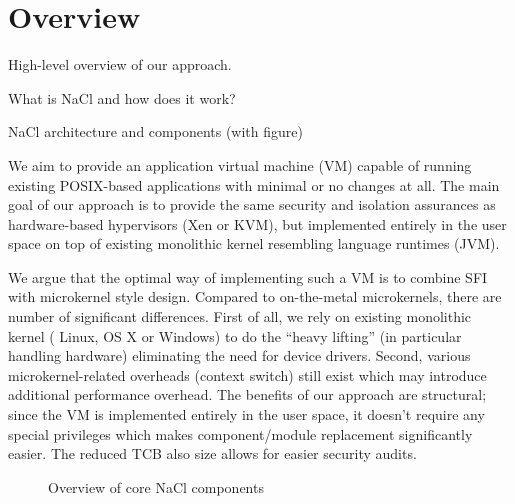 \section{Overview}
\label{sec:overview}

\begin{structure}
\item High-level overview of our approach.
\item What is NaCl and how does it work?
\item NaCl architecture and components (with figure)
\end{structure}


We aim to provide an application virtual machine (VM) capable of running
existing POSIX-based applications with minimal or no changes at all. The
main goal of our approach is to provide the same security and isolation
assurances as hardware-based hypervisors (\eg Xen or KVM), but
implemented entirely in the user space on top of existing monolithic
kernel resembling language runtimes (\eg JVM).


We argue that the optimal way of implementing such a VM is to combine SFI
with microkernel style design.
Compared to on-the-metal microkernels, there are number of significant
differences. First of all, we rely on existing monolithic kernel (\ie
Linux, OS X or Windows) to do the ``heavy lifting'' (in particular
handling hardware) eliminating the need for device drivers. Second,
various microkernel-related overheads (\eg context switch) still exist
which may introduce additional performance overhead. The benefits of our
approach are structural; since the VM is implemented entirely in the
user space, it doesn't require any special privileges which makes
component/module replacement significantly easier. The reduced TCB also
size allows for easier security audits.

\begin{figure}
\centering
\caption{Overview of core NaCl components}
\label{fig:overview}
\end{figure}

